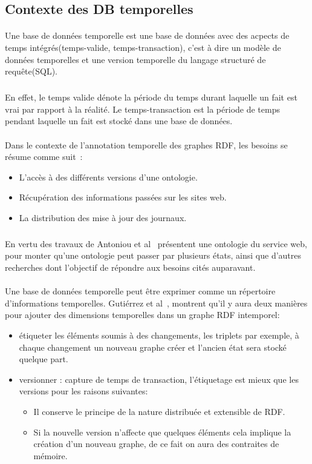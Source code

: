 \subsection*{Contexte des DB temporelles}
\paragraph{}
Une base de données temporelle est une base de données avec des acpects de temps intégrés(temps-valide, temps-transaction), c'est à dire un modèle de données temporelles et une version temporelle du langage structuré de requête(SQL).
\subparagraph{}
En effet, le temps valide dénote la période du temps durant laquelle un fait est vrai par rapport à la réalité.
Le temps-transaction est la période de temps pendant laquelle un fait est stocké dans une base de données.
\paragraph{}
Dans le contexte de l'annotation temporelle des graphes RDF, les besoins se résume comme suit~:
\begin{itemize}
\item L'accès à des différents versions d’une ontologie.
\item Récupération des informations passées sur les sites web.
\item La distribution des mise à jour des journaux.
\end{itemize}
\subparagraph{}
En vertu des travaux de Antoniou et al~\cite{antoniou2004} présentent une ontologie du service web, pour monter qu'une ontologie peut passer par plusieurs états, ainsi que d'autres recherches dont l'objectif de répondre aux besoins cités auparavant. ~
\paragraph{}
Une base de données temporelle peut être exprimer comme un répertoire d'informations temporelles.
Gutiérrez et al~\cite{gutierrez2007}, montrent qu'il y aura deux manières pour ajouter des dimensions temporelles dans un graphe RDF intemporel:
\begin{itemize}
\item étiqueter les éléments soumis à des changements, les triplets par exemple, à chaque changement un nouveau graphe créer et l’ancien état sera stocké quelque part.
\item versionner : capture de temps de transaction, l’étiquetage est mieux que les versions pour les raisons suivantes: 
 \begin{itemize}
\item Il conserve le principe de la nature distribuée et extensible de RDF.
\item Si la nouvelle version n’affecte que quelques éléments cela implique la création d’un nouveau graphe, de ce fait on aura des contraites de mémoire.
\end{itemize}
\end{itemize}
